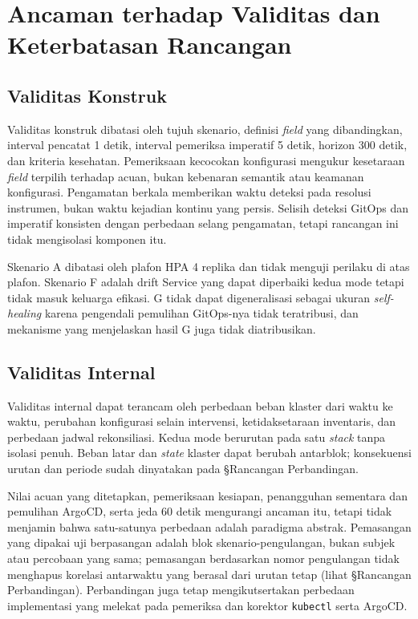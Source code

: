 \section{Ancaman terhadap Validitas dan Keterbatasan Rancangan}

\subsection{Validitas Konstruk}

Validitas konstruk dibatasi oleh tujuh skenario, definisi \textit{field} yang dibandingkan, interval pencatat 1 detik, interval pemeriksa imperatif 5 detik, horizon 300 detik, dan kriteria kesehatan. Pemeriksaan kecocokan konfigurasi mengukur kesetaraan \textit{field} terpilih terhadap acuan, bukan kebenaran semantik atau keamanan konfigurasi. Pengamatan berkala memberikan waktu deteksi pada resolusi instrumen, bukan waktu kejadian kontinu yang persis. Selisih deteksi GitOps dan imperatif konsisten dengan perbedaan selang pengamatan, tetapi rancangan ini tidak mengisolasi komponen itu.

Skenario A dibatasi oleh plafon HPA 4 replika dan tidak menguji perilaku di atas plafon. Skenario F adalah drift Service yang dapat diperbaiki kedua mode tetapi tidak masuk keluarga efikasi. G tidak dapat digeneralisasi sebagai ukuran \textit{self-healing} karena pengendali pemulihan GitOps-nya tidak teratribusi, dan mekanisme yang menjelaskan hasil G juga tidak diatribusikan.

\subsection{Validitas Internal}

Validitas internal dapat terancam oleh perbedaan beban klaster dari waktu ke waktu, perubahan konfigurasi selain intervensi, ketidaksetaraan inventaris, dan perbedaan jadwal rekonsiliasi. Kedua mode berurutan pada satu \textit{stack} tanpa isolasi penuh. Beban latar dan \textit{state} klaster dapat berubah antarblok; konsekuensi urutan dan periode sudah dinyatakan pada §Rancangan Perbandingan.

Nilai acuan yang ditetapkan, pemeriksaan kesiapan, penangguhan sementara dan pemulihan ArgoCD, serta jeda 60 detik mengurangi ancaman itu, tetapi tidak menjamin bahwa satu-satunya perbedaan adalah paradigma abstrak. Pemasangan yang dipakai uji berpasangan adalah blok skenario-pengulangan, bukan subjek atau percobaan yang sama; pemasangan berdasarkan nomor pengulangan tidak menghapus korelasi antarwaktu yang berasal dari urutan tetap (lihat §Rancangan Perbandingan). Perbandingan juga tetap mengikutsertakan perbedaan implementasi yang melekat pada pemeriksa dan korektor \texttt{kubectl} serta ArgoCD.

